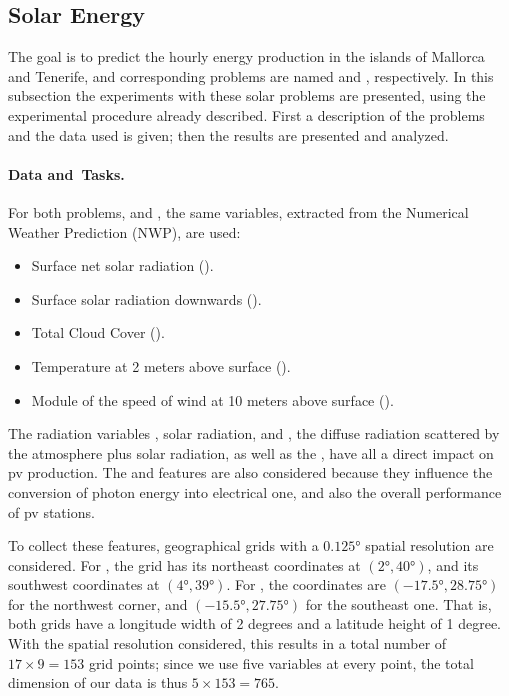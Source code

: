 \subsection{Solar Energy}
The goal is to predict the hourly energy production in the islands of Mallorca and Tenerife, and corresponding problems are named  and , respectively. 
%
In this subsection the experiments with these solar problems are presented, using the experimental procedure already described. First a description of the problems and the data used is given; then the results are presented and analyzed.

\paragraph*{Data and~Tasks.\\}
For both problems,  and , the same variables, extracted from the Numerical Weather Prediction (NWP), are used:
\begin{itemize}
    \item Surface net solar {radiation} ().
    \item Surface solar radiation {downwards} ().
    \item {Total Cloud Cover} %
     ().
    \item Temperature at 2 {meters} above surface ().
    \item Module of the speed of wind at {10 meters} above surface ().
\end{itemize}
The radiation variables , solar radiation, and , the diffuse radiation scattered by the atmosphere plus solar radiation, as well as the , have all a direct impact on \acrshort{pv} production.
%
The  and  features are also considered because they influence the conversion of photon energy into electrical one, and also the overall performance of \acrshort{pv} stations.
%

To collect these features, geographical grids with a $\ang{0.125}$ spatial resolution are considered. For , the grid has its northeast coordinates at $(\ang{2}, \ang{40})$, and its southwest coordinates at $(\ang{4}, \ang{39})$. For , the coordinates are $(\ang{-17.5}, \ang{28.75})$ for the northwest corner, and $(\ang{-15.5}, \ang{27.75})$ for the southeast one.
%
That is, both grids have a longitude width of 2 degrees and a latitude height of 1 degree. With the spatial resolution considered, this results in a total number of $17 \times 9 = 153$ grid points; since we use five variables at every point, the total dimension of our data is thus $5 \times 153 = 765$. 


